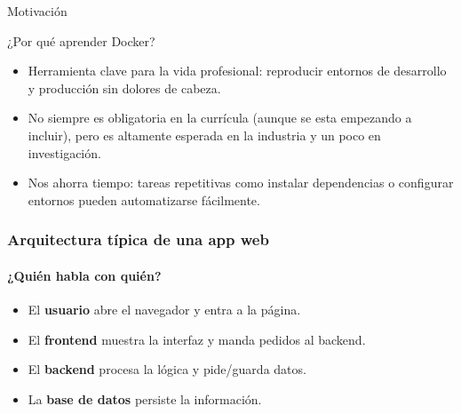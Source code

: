 \begin{frame}{Motivación}

    \begin{block}{¿Por qué aprender Docker?}
        \begin{itemize}
            \item Herramienta clave para la vida profesional: reproducir entornos de desarrollo y producción sin dolores de cabeza.
            \pause
            \item No siempre es obligatoria en la currícula (aunque se esta empezando a incluir), pero es altamente esperada en la industria y un poco en investigación.
            \pause
            \item Nos ahorra tiempo: tareas repetitivas como instalar dependencias o configurar entornos pueden automatizarse fácilmente.
    \end{itemize}
\end{block}
    
\end{frame}

\begin{frame}
    \frametitle{Arquitectura típica de una app web}
    \framesubtitle{¿Quién habla con quién?}

    \begin{center}
    \end{center}

    \begin{itemize}
        \item El \textbf{usuario} abre el navegador y entra a la página.
        \item El \textbf{frontend} muestra la interfaz y manda pedidos al backend.
        \item El \textbf{backend} procesa la lógica y pide/guarda datos.
        \item La \textbf{base de datos} persiste la información.
    \end{itemize}
\end{frame}

